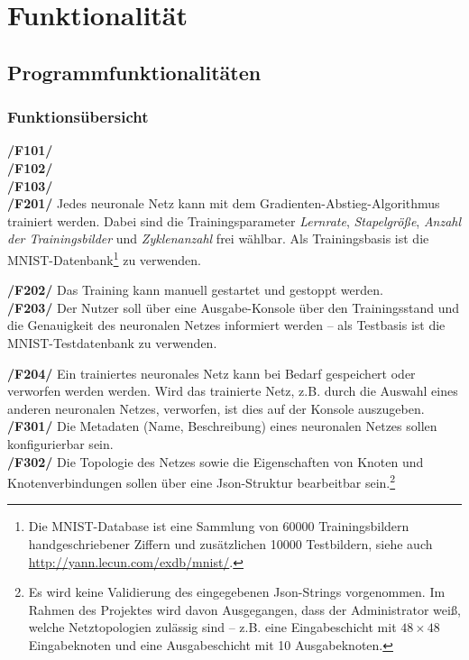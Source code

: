 \section{Funktionalität}

\subsection{Programmfunktionalitäten}
\subsubsection{Funktionsübersicht}

\textbf{/F101/}\\[-0.2cm]

\textbf{/F102/}\\[-0.2cm]

\textbf{/F103/}\\[-0.2cm]

\textbf{/F201/} Jedes neuronale Netz kann mit dem Gradienten-Abstieg-Algorithmus trainiert werden. Dabei sind die Trainingsparameter \emph{Lernrate}, \emph{Stapelgröße}, \emph{Anzahl der Trainingsbilder} und \emph{Zyklenanzahl} frei wählbar. Als Trainingsbasis ist die MNIST-Datenbank\footnote{Die MNIST-Database ist eine Sammlung von 60000 Trainingsbildern handgeschriebener Ziffern und zusätzlichen 10000 Testbildern, siehe auch \url{http://yann.lecun.com/exdb/mnist/}.} zu verwenden.

\textbf{/F202/} Das Training kann manuell gestartet und gestoppt werden.\\[-0.2cm]

\textbf{/F203/} Der Nutzer soll über eine Ausgabe-Konsole über den Trainingsstand und die Genauigkeit des neuronalen Netzes informiert werden -- als Testbasis ist die MNIST-Testdatenbank zu verwenden.

\textbf{/F204/} Ein trainiertes neuronales Netz kann bei Bedarf gespeichert oder verworfen werden werden. Wird das trainierte Netz, z.B. durch die Auswahl eines anderen neuronalen Netzes, verworfen, ist dies auf der Konsole auszugeben. \\[-0.2cm]

\textbf{/F301/} Die Metadaten (Name, Beschreibung) eines neuronalen Netzes sollen konfigurierbar sein.\\[-0.2cm]

\textbf{/F302/} Die Topologie des Netzes sowie die Eigenschaften von Knoten und Knotenverbindungen sollen über eine Json-Struktur bearbeitbar sein.\footnote{Es wird keine Validierung des eingegebenen Json-Strings vorgenommen. Im Rahmen des Projektes wird davon Ausgegangen, dass der Administrator weiß, welche Netztopologien zulässig sind -- z.B. eine Eingabeschicht mit $48 \times 48$ Eingabeknoten und eine Ausgabeschicht mit 10 Ausgabeknoten.}\\[-0.2cm]

